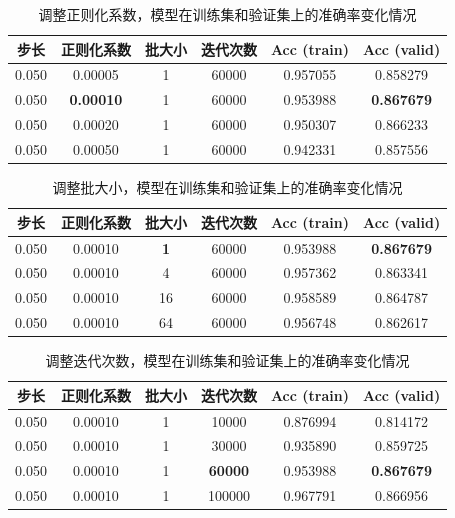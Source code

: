 \documentclass[12pt, a4paper]{article}
\begin{document}
        \begin{table}[htbp]
        \caption{调整正则化系数，模型在训练集和验证集上的准确率变化情况}
        \centering
        \begin{tabular}{cccccc}
            \toprule
            步长  & 正则化系数         & 批大小 & 迭代次数 & Acc (train) & Acc (valid)        \\
            \midrule
            0.050 &  0.00005          &   1    &  60000  &  0.957055   &  0.858279          \\
            0.050 &  \textbf{0.00010} &   1    &  60000  &  0.953988   &  \textbf{0.867679} \\
            0.050 &  0.00020          &   1    &  60000  &  0.950307   &  0.866233          \\
            0.050 &  0.00050          &   1    &  60000  &  0.942331   &  0.857556
        \end{tabular}
        \end{table}

        \begin{table}[htbp]
        \caption{调整批大小，模型在训练集和验证集上的准确率变化情况}
        \centering
        \begin{tabular}{cccccc}
            \toprule
            步长  & 正则化系数 & 批大小      & 迭代次数 & Acc (train) & Acc (valid)        \\
            \midrule
            0.050 &  0.00010  &  \textbf{1} &  60000  &  0.953988   &  \textbf{0.867679} \\
            0.050 &  0.00010  &  4          &  60000  &  0.957362   &  0.863341          \\
            0.050 &  0.00010  &  16         &  60000  &  0.958589   &  0.864787          \\
            0.050 &  0.00010  &  64         &  60000  &  0.956748   &  0.862617
        \end{tabular}
        \end{table}

        \begin{table}[htbp]
        \caption{调整迭代次数，模型在训练集和验证集上的准确率变化情况}
        \centering
        \begin{tabular}{cccccc}
            \toprule
            步长  & 正则化系数 & 批大小 & 迭代次数        & Acc (train) & Acc (valid)        \\
            \midrule
            0.050 &  0.00010  &   1    & 10000          &  0.876994   &  0.814172          \\
            0.050 &  0.00010  &   1    & 30000          &  0.935890   &  0.859725          \\
            0.050 &  0.00010  &   1    & \textbf{60000} &  0.953988   &  \textbf{0.867679} \\
            0.050 &  0.00010  &   1    & 100000         &  0.967791   &  0.866956
        \end{tabular}
        \end{table}
\end{document}
